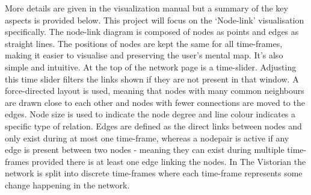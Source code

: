 More details are given in the visualization manual \cite{vismanual} but a summary of the key aspects is provided below.
This project will focus on the ‘Node-link’ visualisation specifically. The node-link diagram is composed of nodes as points and edges as straight lines. The positions of nodes are kept the same for all time-frames, making it easier to visualise \cite{tsotaivg} and preserving the user's mental map\cite{}. It's also simple and intuitive.
At the top of the network page is a time-slider. Adjusting this time slider filters the links shown if they are not present in that window. A force-directed layout is used, meaning that nodes with many common neighbours are drawn close to each other and nodes with fewer connections are moved to the edges. Node size is used to indicate the node degree and line colour indicates a specific type of relation. Edges are defined as the direct links between nodes and only exist during at most one time-frame, whereas a nodepair is active if any edge is present between two nodes - meaning they can exist during multiple time-frames provided there is at least one edge linking the nodes. In The Vistorian the network is split into discrete time-frames where each time-frame represents some change happening in the network. 






